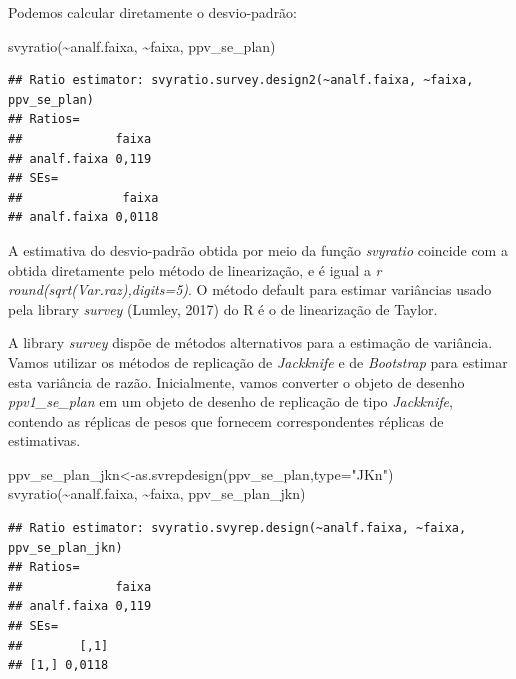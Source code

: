 \documentclass[
  12pt,
  brazilian,
]{book}
\newenvironment{Shaded}{\begin{snugshade}}{\end{snugshade}}
\newcommand{\AttributeTok}[1]{\textcolor[rgb]{0.77,0.63,0.00}{#1}}
\newcommand{\FunctionTok}[1]{\textcolor[rgb]{0.00,0.00,0.00}{#1}}
\newcommand{\NormalTok}[1]{#1}
\newcommand{\OtherTok}[1]{\textcolor[rgb]{0.56,0.35,0.01}{#1}}
\newcommand{\SpecialCharTok}[1]{\textcolor[rgb]{0.00,0.00,0.00}{#1}}
\newcommand{\StringTok}[1]{\textcolor[rgb]{0.31,0.60,0.02}{#1}}
\theoremstyle{definition}
\theoremstyle{definition}
\theoremstyle{definition}
\theoremstyle{definition}
\theoremstyle{remark}
\begin{document}
Podemos calcular diretamente o desvio-padrão:

\begin{Shaded}
\begin{Highlighting}[]
\FunctionTok{svyratio}\NormalTok{(}\SpecialCharTok{\textasciitilde{}}\NormalTok{analf.faixa, }\SpecialCharTok{\textasciitilde{}}\NormalTok{faixa, ppv\_se\_plan)}
\end{Highlighting}
\end{Shaded}

\begin{verbatim}
## Ratio estimator: svyratio.survey.design2(~analf.faixa, ~faixa, ppv_se_plan)
## Ratios=
##             faixa
## analf.faixa 0,119
## SEs=
##              faixa
## analf.faixa 0,0118
\end{verbatim}

A estimativa do desvio-padrão obtida por meio da função \emph{svyratio} coincide com a obtida diretamente pelo método
de linearização, e é igual a \emph{r round(sqrt(Var.raz),digits=5)}. O método default para estimar variâncias
usado pela library \emph{survey} (Lumley, 2017) do R é o de linearização de Taylor.

A library \emph{survey} dispõe de métodos alternativos para a estimação de variância. Vamos utilizar os métodos de replicação
de \emph{Jackknife} e de \emph{Bootstrap} para estimar esta variância de razão. Inicialmente, vamos converter o objeto de desenho \emph{ppv1\_se\_plan} em um objeto de desenho de replicação de tipo \emph{Jackknife}, contendo as réplicas de pesos que fornecem correspondentes réplicas de estimativas.

\begin{Shaded}
\begin{Highlighting}[]
\NormalTok{ppv\_se\_plan\_jkn}\OtherTok{\textless{}{-}}\FunctionTok{as.svrepdesign}\NormalTok{(ppv\_se\_plan,}\AttributeTok{type=}\StringTok{"JKn"}\NormalTok{)}
\FunctionTok{svyratio}\NormalTok{(}\SpecialCharTok{\textasciitilde{}}\NormalTok{analf.faixa, }\SpecialCharTok{\textasciitilde{}}\NormalTok{faixa, ppv\_se\_plan\_jkn)}
\end{Highlighting}
\end{Shaded}

\begin{verbatim}
## Ratio estimator: svyratio.svyrep.design(~analf.faixa, ~faixa, ppv_se_plan_jkn)
## Ratios=
##             faixa
## analf.faixa 0,119
## SEs=
##        [,1]
## [1,] 0,0118
\end{verbatim}
\end{document}

